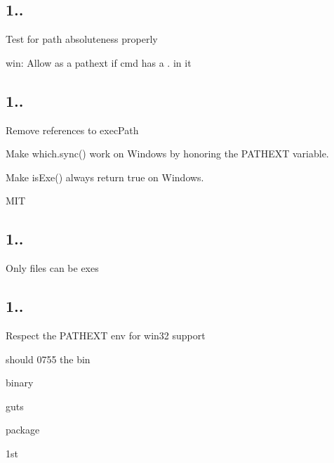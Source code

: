 \subsection*{1..}


\begin{DoxyItemize}
\item Test for path absoluteness properly
\item win\+: Allow \textquotesingle{}\textquotesingle{} as a pathext if cmd has a . in it
\end{DoxyItemize}

\subsection*{1..}


\begin{DoxyItemize}
\item Remove references to exec\+Path
\item Make {\ttfamily which.\+sync()} work on Windows by honoring the P\+A\+T\+H\+E\+XT variable.
\item Make {\ttfamily is\+Exe()} always return true on Windows.
\item M\+IT
\end{DoxyItemize}

\subsection*{1..}


\begin{DoxyItemize}
\item Only files can be exes
\end{DoxyItemize}

\subsection*{1..}


\begin{DoxyItemize}
\item Respect the P\+A\+T\+H\+E\+XT env for win32 support
\item should 0755 the bin
\item binary
\item guts
\item package
\item 1st 
\end{DoxyItemize}